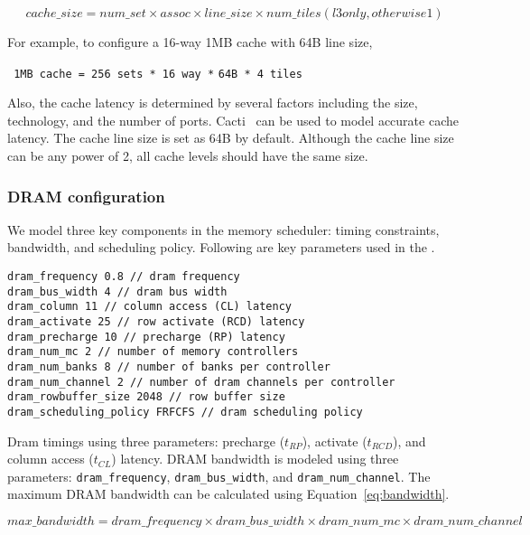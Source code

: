 \begin{equation}
\label{eq:cachesize}
cache\_size = num\_set \times assoc \times line\_size \times num\_tiles (l3 only, otherwise 1)
\end{equation}


\noindent
For example, to configure a 16-way 1MB cache with 64B line size,

\Verb+ 1MB cache = 256 sets * 16 way *+ \Verb+64B * 4 tiles+

\noindent
Also, the cache latency is determined by several factors including the
size, technology, and the number of ports. Cacti~\cite{cacti} can be
used to model accurate cache latency. The cache line size is set as
64B by default. Although the cache line size can be any power of 2,
all cache levels should have the same size.


\subsubsection{DRAM configuration}
\label{sec:param-dram}

We model three key components in the memory scheduler: timing
constraints, bandwidth, and scheduling policy. Following are key
parameters used in the \SIM.


\begin{Verbatim}
dram_frequency 0.8 // dram frequency
dram_bus_width 4 // dram bus width
dram_column 11 // column access (CL) latency
dram_activate 25 // row activate (RCD) latency
dram_precharge 10 // precharge (RP) latency
dram_num_mc 2 // number of memory controllers
dram_num_banks 8 // number of banks per controller
dram_num_channel 2 // number of dram channels per controller
dram_rowbuffer_size 2048 // row buffer size
dram_scheduling_policy FRFCFS // dram scheduling policy
\end{Verbatim}


Dram timings using three parameters: precharge ($t_{RP}$), activate
($t_{RCD}$), and column access ($t_{CL}$) latency. DRAM bandwidth is
modeled using three
parameters: \Verb+dram_frequency+, \Verb+dram_bus_width+,
and \Verb+dram_num_channel+. The maximum DRAM bandwidth can be
calculated using Equation~\ref{eq:bandwidth}.

\begin{equation}
\label{eq:bandwidth}
max\_bandwidth = dram\_frequency \times dram\_bus\_width \times dram\_num\_mc \times dram\_num\_channel 
\end{equation}

